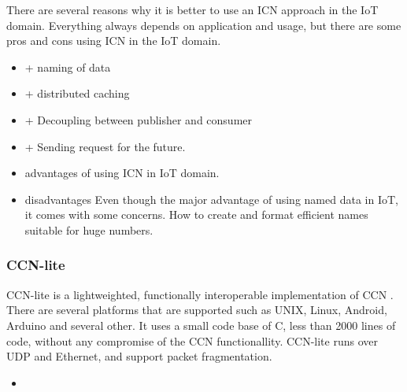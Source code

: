 There are several reasons why it is better to use an ICN approach in the IoT domain. Everything always depends on application and usage, but there are some pros and cons using ICN in the IoT domain.

\begin{itemize}
	\item + naming of data
	\item + distributed caching
	\item + Decoupling between publisher and consumer
	\item + Sending request for the future.
	\item advantages of using ICN in IoT domain.
	\item disadvantages
	Even though the major advantage of using named data in IoT, it comes with some concerns. How to create and format efficient names suitable for huge numbers.
\end{itemize}




\subsubsection{CCN-lite}
CCN-lite is a lightweighted, functionally interoperable implementation of CCN \cite{CCN-LITE}. There are several platforms that are supported such as UNIX, Linux, Android, Arduino and several other. It uses a small code base of C, less than 2000 lines of code, without any compromise of the CCN functionallity. CCN-lite runs over UDP and Ethernet, and support packet fragmentation.
\\

\begin{itemize}
	\item 
\end{itemize}





















